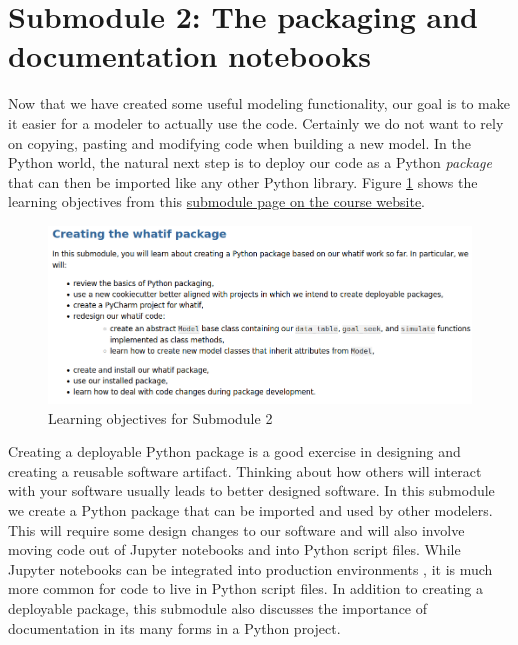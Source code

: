 \documentclass[ited,blindrev]{informs3}              %
\begin{document}
\section{Submodule 2: The packaging and documentation notebooks}

Now that we have created some useful modeling functionality, our goal is to make it easier for a modeler to actually use the code. Certainly we do not want to rely on copying, pasting and modifying code when building a new model. In the Python world, the natural next step is to deploy our code as a Python \textit{package} \citep{buezenWelcomePythonPackages2022} that can then be imported like any other Python library. Figure \ref{fig:objectives_packaging} shows the learning objectives from this \href{http://www.sba.oakland.edu/faculty/isken/courses/aap/mod3b_whatif_packaging.html}{submodule page on the course website}.

\begin{figure}[!htbp]
	\centering
	\includegraphics[scale=0.5]{objectives_packaging}
	\caption{Learning objectives for Submodule 2}
	\label{fig:objectives_packaging}
\end{figure}

Creating a deployable Python package is a good exercise in designing and creating a reusable software artifact. Thinking about how others will interact with your software usually leads to better designed software.  In this submodule we create a Python package that can be imported and used by other modelers. This will require some design changes to our software and will also involve moving code out of Jupyter notebooks and into Python script files. While Jupyter notebooks can be integrated into production environments \citep{uffordInteractiveNotebookInnovation2019}, it is much more common for code to live in Python script files. In addition to creating a deployable package, this submodule also discusses the importance of documentation in its many forms in a Python project.
\end{document}
